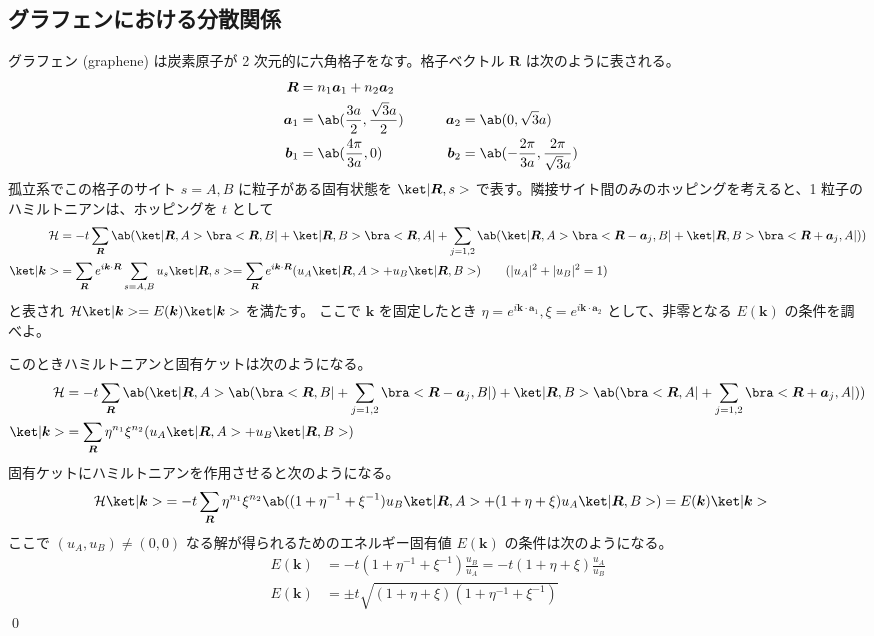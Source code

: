 \documentclass[uplatex,dvipdfmx,a4paper,11pt]{jlreq}
\makeatletter
\newcommand{\R}{\bm{R}}
\renewcommand{\aa}{\bm{a}}
\newcommand{\bb}{\bm{b}}
\newcommand{\kk}{\bm{k}}
\numberwithin{equation}{section}
\theoremstyle{definition}
\renewenvironment{proof}[1][\proofname]{\par
  \normalfont
  \topsep6\p@\@plus6\p@ \trivlist
  \item[\hskip\labelsep{\bfseries #1}\@addpunct{\bfseries}]\ignorespaces\quad\par
}{%
  \qed\endtrivlist\@endpefalse
}
\renewcommand\proofname{証明}
\makeatother
\begin{document}
\subsection{グラフェンにおける分散関係}
\begin{problem}
グラフェン (graphene) は炭素原子が 2 次元的に六角格子をなす。格子ベクトル $\R$ は次のように表される。
\begin{alignat}{3}
  \R    & = n_1\aa_1 + n_2\aa_2                                                                                     \\
  \aa_1 & = \ab(\frac{3a}{2}, \frac{\sqrt{3}a}{2}) & \qquad \aa_2 & = \ab(0, \sqrt{3}a)                             \\
  \bb_1 & = \ab(\frac{4\pi}{3a}, 0)                & \qquad \bb_2 & = \ab(-\frac{2\pi}{3a}, \frac{2\pi}{\sqrt{3}a})
\end{alignat}
孤立系でこの格子のサイト $s = A, B$ に粒子がある固有状態を $\ket|\R, s>$ で表す。隣接サイト間のみのホッピングを考えると、1 粒子のハミルトニアンは、ホッピングを $t$ として
\begin{align}
  \mathcal{H} & = -t\sum_{\R}\ab(\ket|\R, A>\bra<\R, B| + \ket|\R, B>\bra<\R, A| + \sum_{j=1,2}\ab(\ket|\R, A>\bra<\R - \aa_j, B| + \ket|\R, B>\bra<\R + \aa_j, A|)) \\
  \ket|\kk>   & = \sum_{\R}e^{i\kk\cdot\R}\sum_{s=A,B}u_s\ket|\R, s> = \sum_{\R}e^{i\kk\cdot\R}(u_A\ket|\R, A> + u_B\ket|\R, B>) \qquad (|u_A|^2 + |u_B|^2 = 1)
\end{align}
と表され $\mathcal{H}\ket|\kk> = E(\kk)\ket|\kk>$ を満たす。
ここで $\kk$ を固定したとき $\eta = e^{i\kk\cdot\aa_1}, \xi = e^{i\kk\cdot\aa_2}$ として、非零となる $E(\kk)$ の条件を調べよ。
\end{problem}
\begin{proof}
  このときハミルトニアンと固有ケットは次のようになる。
  \begin{align}
    \mathcal{H} & = -t\sum_{\R}\ab(\ket|\R, A>\ab(\bra<\R, B| + \sum_{j=1,2}\bra<\R - \aa_j, B|) + \ket|\R, B>\ab(\bra<\R, A| + \sum_{j=1,2}\bra<\R + \aa_j, A|)) \\
    \ket|\kk>   & = \sum_{\R}\eta^{n_1}\xi^{n_2}(u_A\ket|\R, A> + u_B\ket|\R, B>)
  \end{align}
  固有ケットにハミルトニアンを作用させると次のようになる。
  \begin{align}
    \mathcal{H}\ket|\kk> & = -t\sum_{\R}\eta^{n_1}\xi^{n_2}\ab((1 + \eta^{-1} + \xi^{-1})u_B\ket|\R, A> + (1 + \eta + \xi)u_A\ket|\R, B>) = E(\kk)\ket|\kk>
  \end{align}
  ここで $(u_A, u_B) \neq (0, 0)$ なる解が得られるためのエネルギー固有値 $E(\kk)$ の条件は次のようになる。
  \begin{align}
    E(\kk) & = -t(1 + \eta^{-1} + \xi^{-1})\frac{u_B}{u_A} = -t(1 + \eta + \xi)\frac{u_A}{u_B} \\
    E(\kk) & = \pm t\sqrt{(1 + \eta + \xi)(1 + \eta^{-1} + \xi^{-1})}
  \end{align}
\end{proof}
\end{document}

